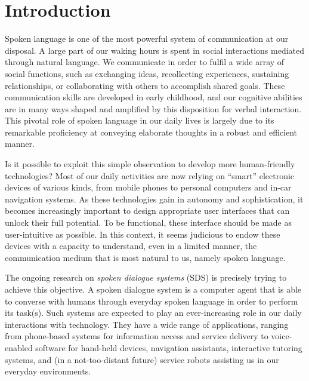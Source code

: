 
\chapter{Introduction}

Spoken language is one of the most powerful system of communication at our disposal. A large part of our waking hours is spent in social interactions mediated through natural language.  We communicate in order to fulfil a wide array of social functions, such as exchanging ideas, recollecting experiences,  sustaining relationships, or collaborating with others to accomplish shared goals. These communication skills are developed in early childhood, and our cognitive abilities are in many ways shaped and amplified by this disposition for verbal interaction.  This pivotal role of spoken language in our daily lives is largely due to its remarkable proficiency at conveying elaborate thoughts in a robust and efficient manner. 

Is it possible to exploit this simple observation to develop more human-friendly technologies? Most of our daily activities are now relying on ``smart'' electronic devices of various kinds, from mobile phones to personal computers and in-car navigation systems. As these technologies gain in autonomy and sophistication, it becomes increasingly important to design appropriate user interfaces that can unlock their full potential.  To be functional, these interface should be made as user-intuitive as possible. In this context, it seems judicious to endow these devices with a capacity to understand, even in a limited manner, the communication medium that is most natural to us, namely spoken language.  

The ongoing research on \textit{spoken dialogue systems} (SDS) is precisely trying to achieve this objective. A spoken dialogue system is a computer agent that is able to converse with humans through everyday spoken language in order to perform its task(s). Such systems are expected to play an ever-increasing role in our daily interactions with technology. They have a wide range of applications, ranging from phone-based systems for information access and service delivery to voice-enabled software for hand-held devices, navigation assistants, interactive tutoring systems, and (in a not-too-distant future) service robots assisting us in our everyday environments.

